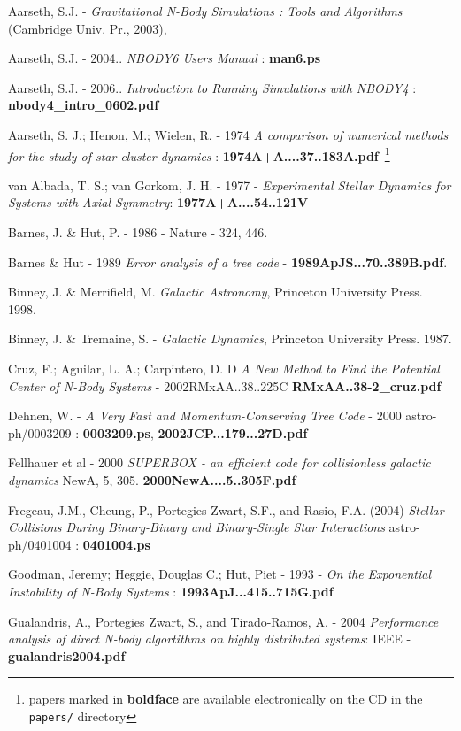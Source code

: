 Aarseth, S.J. - 
{\it Gravitational N-Body Simulations : Tools and Algorithms} 
(Cambridge Univ. Pr., 2003),

Aarseth, S.J. - 2004.. {\it NBODY6 Users Manual} : {\bf man6.ps}

Aarseth, S.J. - 2006.. {\it Introduction to Running Simulations with NBODY4} : 
{\bf nbody4\_intro\_0602.pdf}


Aarseth, S. J.; Henon, M.; Wielen, R. - 1974
{\it A comparison of numerical methods for the study of star cluster 
dynamics} : {\bf 1974A+A....37..183A.pdf}~\footnote{papers marked 
in {\bf boldface} are available electronically on the CD in the {\tt papers/} directory}

van Albada, T. S.; van Gorkom, J. H.	- 1977 -
{\it Experimental Stellar Dynamics for Systems with Axial Symmetry}:
{\bf 1977A+A....54..121V}



Barnes, J. \& Hut, P. - 1986 - Nature - 324, 446.

Barnes \& Hut - 1989
{\it Error analysis of a tree code} - {\bf 1989ApJS...70..389B.pdf}.

Binney, J. \& Merrifield, M. {\it Galactic Astronomy}, Princeton University Press. 1998.

Binney, J. \& Tremaine, S. - {\it Galactic Dynamics}, Princeton University Press. 1987. 

Cruz, F.; Aguilar, L. A.; Carpintero, D. D
{\it A New Method to Find the Potential Center of N-Body Systems} - 2002RMxAA..38..225C
{\bf RMxAA..38-2\_cruz.pdf}

Dehnen, W. - {\it A Very Fast and Momentum-Conserving Tree Code} - 2000
astro-ph/0003209 : {\bf 0003209.ps}, {\bf 2002JCP...179...27D.pdf}

Fellhauer et al - 2000 
{\it SUPERBOX - an efficient code for collisionless galactic dynamics}
NewA, 5, 305. {\bf 2000NewA....5..305F.pdf} 

Fregeau, J.M., Cheung, P., Portegies Zwart, S.F., and Rasio, F.A. (2004)
{\it Stellar Collisions During Binary-Binary and Binary-Single Star Interactions}
astro-ph/0401004 : {\bf 0401004.ps}

Goodman, Jeremy; Heggie, Douglas C.; Hut, Piet - 1993 -
{\it On the Exponential Instability of N-Body Systems} :
{\bf 1993ApJ...415..715G.pdf}

Gualandris, A., Portegies Zwart, S., and Tirado-Ramos, A. - 2004
{\it Performance analysis of direct N-body algortithms on highly distributed systems}:
IEEE - {\bf gualandris2004.pdf}

